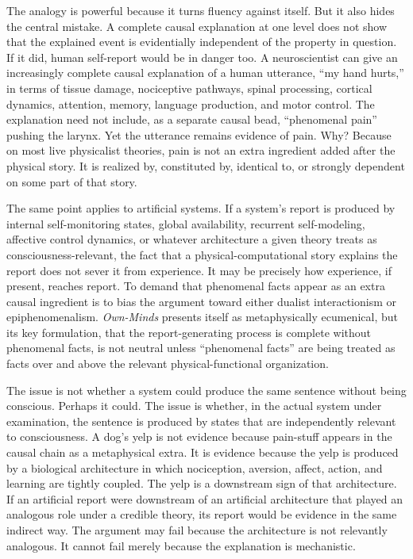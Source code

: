 \documentclass[11pt]{article}
\begin{document}
The analogy is powerful because it turns fluency against itself. But it also hides the central mistake. A complete causal explanation at one level does not show that the explained event is evidentially independent of the property in question. If it did, human self-report would be in danger too. A neuroscientist can give an increasingly complete causal explanation of a human utterance, ``my hand hurts,'' in terms of tissue damage, nociceptive pathways, spinal processing, cortical dynamics, attention, memory, language production, and motor control. The explanation need not include, as a separate causal bead, ``phenomenal pain'' pushing the larynx. Yet the utterance remains evidence of pain. Why? Because on most live physicalist theories, pain is not an extra ingredient added after the physical story. It is realized by, constituted by, identical to, or strongly dependent on some part of that story.

The same point applies to artificial systems. If a system's report is produced by internal self-monitoring states, global availability, recurrent self-modeling, affective control dynamics, or whatever architecture a given theory treats as consciousness-relevant, the fact that a physical-computational story explains the report does not sever it from experience. It may be precisely how experience, if present, reaches report. To demand that phenomenal facts appear as an extra causal ingredient is to bias the argument toward either dualist interactionism or epiphenomenalism. \textit{Own-Minds} presents itself as metaphysically ecumenical, but its key formulation, that the report-generating process is complete without phenomenal facts, is not neutral unless ``phenomenal facts'' are being treated as facts over and above the relevant physical-functional organization.

The issue is not whether a system could produce the same sentence without being conscious. Perhaps it could. The issue is whether, in the actual system under examination, the sentence is produced by states that are independently relevant to consciousness. A dog's yelp is not evidence because pain-stuff appears in the causal chain as a metaphysical extra. It is evidence because the yelp is produced by a biological architecture in which nociception, aversion, affect, action, and learning are tightly coupled. The yelp is a downstream sign of that architecture. If an artificial report were downstream of an artificial architecture that played an analogous role under a credible theory, its report would be evidence in the same indirect way. The argument may fail because the architecture is not relevantly analogous. It cannot fail merely because the explanation is mechanistic.
\end{document}
